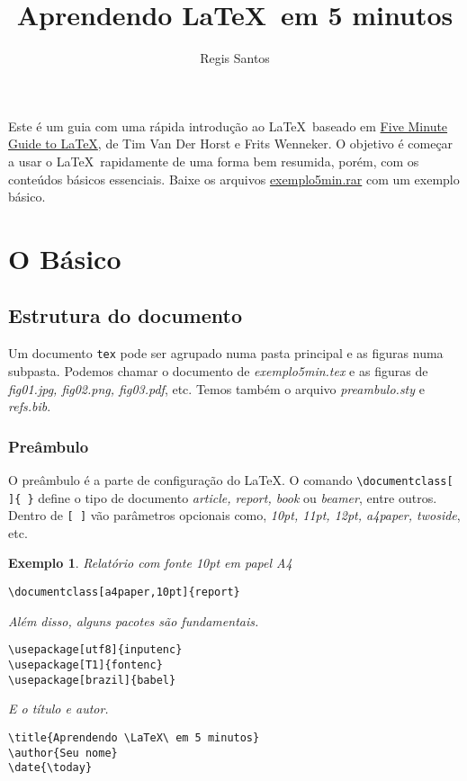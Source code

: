 \documentclass[a4paper]{article}
\title{Aprendendo \LaTeX\ em 5 minutos}
\author{Regis Santos}
\date{\the\year}
\newtheorem{ex}{Exemplo}
\begin{document}
\maketitle

Este \'e um guia com uma r\'apida introdu\c c\~ao ao \LaTeX\ baseado em \href{http://www.howtotex.com/general/five-minute-guide-to-latex/}{Five Minute Guide to \LaTeX}, de Tim Van Der Horst e Frits Wenneker. O objetivo \'e come\c car a usar o \LaTeX\ rapidamente de uma forma bem resumida, por\'em, com os conte\'udos b\'asicos essenciais. Baixe os arquivos \href{https://bitbucket.org/rg3915/latex/downloads/exemplo5min.rar}{exemplo5min.rar} com um exemplo b\'asico.

\section{O B\'asico}

\subsection{Estrutura do documento}

Um documento \verb|tex| pode ser agrupado numa pasta principal e as figuras numa subpasta. Podemos chamar o documento de \textit{exemplo5min.tex} e as figuras de \textit{fig01.jpg, fig02.png, fig03.pdf}, etc. Temos tamb\'em o arquivo \textit{preambulo.sty} e \textit{refs.bib}.

\subsubsection{Pre\^ambulo}

O pre\^ambulo \'e a parte de configura\c c\~ao do \LaTeX. O comando \verb|\documentclass[ ]{ }| define o tipo de documento \textit{article, report, book} ou \textit{beamer}, entre outros. Dentro de \verb|[ ]| v\~ao par\^ametros opcionais como, \textit{10pt, 11pt, 12pt, a4paper, twoside}, etc.

\begin{ex}
Relat\'orio com fonte 10pt em papel A4

\begin{verbatim}
\documentclass[a4paper,10pt]{report}
\end{verbatim} 

Al\'em disso, alguns pacotes s\~ao fundamentais.

\begin{verbatim}
\usepackage[utf8]{inputenc}
\usepackage[T1]{fontenc}
\usepackage[brazil]{babel}
\end{verbatim} 

E o t\'itulo e autor.

\begin{verbatim}
\title{Aprendendo \LaTeX\ em 5 minutos}
\author{Seu nome}
\date{\today}
\end{verbatim} 

\end{ex}
\end{document}

